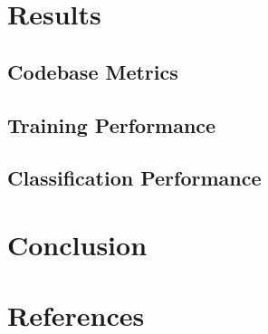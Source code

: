 \documentclass{report}
\begin{document}

\chapter{Results}

\section{Codebase Metrics}


\section{Training Performance}


\section{Classification Performance}


\chapter{Conclusion}


\chapter{References}

\printbibliography
\end{document}
